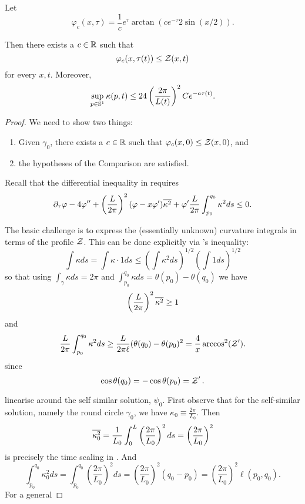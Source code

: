 \documentclass[a4paper, 12pt]{amsart}
\begin{document}
\begin{thm}
\label{thm:comparison_function}
Let
\[
\varphi_c(x, \tau) = \frac{1}{c} e^{\tau} \arctan(c e^{-\tau} 2\sin(x/2)).
\]

Then there exists a $c \in \R$ such that
\[
\varphi_c(x, \tau(t)) \leq \chordarcprofile(x, t)
\]
for every $x, t$. Moreover,
\[
\sup_{p \in \S^1} \kappa(p, t) \leq 24\left(\frac{2\pi}{L(t)}\right)^2 Ce^{-a\tau(t)}.
\]
\end{thm}

\begin{proof}
We need to show two things:
\begin{enumerate}
\item Given \(\gamma_0\), there exists a \(c \in \R\) such that \(\varphi_c(x, 0) \leq \chordarcprofile(x, 0)\), and
\item the hypotheses of the Comparison  are satisfied.
\end{enumerate}

Recall that the differential inequality in  requires
\[
\partial_{\tau} \varphi - 4 \varphi'' + \left(\frac{L}{2\pi}\right)^2 (\varphi - x \varphi') \avg{\kappa^2} + \varphi' \frac{L}{2\pi} \int_{p_0}^{q_0} \kappa^2 ds \leq 0.
\]

The basic challenge is to express the (essentially unknown) curvature integrals in terms of the profile \(\chordarcprofile\). This can be done explicitly via \holder{}'s inequality:
\[
\int \kappa ds = \int \kappa \cdot 1 ds \leq \left(\int \kappa^2 ds\right)^{1/2} \left(\int 1 ds\right)^{1/2}
\]
so that using \(\int_{\gamma} \kappa ds = 2\pi\) and \(\int_{p_0}^{q_0} \kappa ds = \theta(p_0) - \theta(q_0)\) we have
\[
\left(\frac{L}{2\pi}\right)^2 \avg{\kappa^2} \geq 1
\]
and
\[
\frac{L}{2\pi} \int_{p_0}^{q_0} \kappa^2 ds \geq \frac{L}{2\pi \ell} (\theta(q_0) - \theta(p_0)^2 = \frac{4}{x} \arccos^2(\chordarcprofile').
\]
since
\[
\cos \theta(q_0) = - \cos \theta(p_0) = \chordarcprofile'.
\]

linearise around the self similar solution, \(\psi_0\). First observe that for the self-similar solution, namely the round circle \(\gamma_0\), we have \(\kappa_0 \equiv \tfrac{2\pi}{L_0}\). Then
\[
\avg{\kappa_0^2} = \frac{1}{L_0}\int_0^L \left(\frac{2\pi}{L_0}\right)^2 ds = \left(\frac{2\pi}{L_0}\right)^2
\]
is precisely the time scaling in . And
\[
\int_{p_0}^{q_0} \kappa_0^2 ds = \int_{p_0}^{q_0} \left(\frac{2\pi}{L_0}\right)^2 ds = \left(\frac{2\pi}{L_0}\right)^2 (q_0 - p_0) = \left(\frac{2\pi}{L_0}\right)^2 \ell(p_0, q_0).
\]
For a general


\end{proof}
\end{document}
